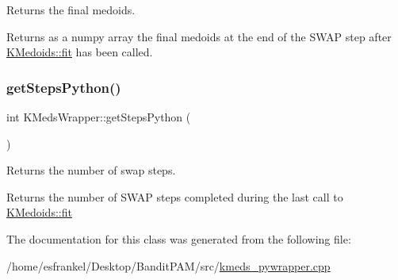 Returns the final medoids. 

Returns as a numpy array the final medoids at the end of the S\+W\+AP step after \hyperlink{classKMedoids_ae241800e72a6b4a677333ffbf06e1798}{K\+Medoids\+::fit} has been called. \mbox{\label{classKMedsWrapper_a25ac2830354eeae7963cdec34d0137e8}} 
\subsubsection{\texorpdfstring{get\+Steps\+Python()}{getStepsPython()}}
{\footnotesize\ttfamily int K\+Meds\+Wrapper\+::get\+Steps\+Python (\begin{DoxyParamCaption}{ }\end{DoxyParamCaption})\hspace{0.3cm}{\ttfamily [inline]}}



Returns the number of swap steps. 

Returns the number of S\+W\+AP steps completed during the last call to \hyperlink{classKMedoids_ae241800e72a6b4a677333ffbf06e1798}{K\+Medoids\+::fit} 

The documentation for this class was generated from the following file\+:\begin{DoxyCompactItemize}
\item 
/home/esfrankel/\+Desktop/\+Bandit\+P\+A\+M/src/\hyperlink{kmeds__pywrapper_8cpp}{kmeds\+\_\+pywrapper.\+cpp}\end{DoxyCompactItemize}
